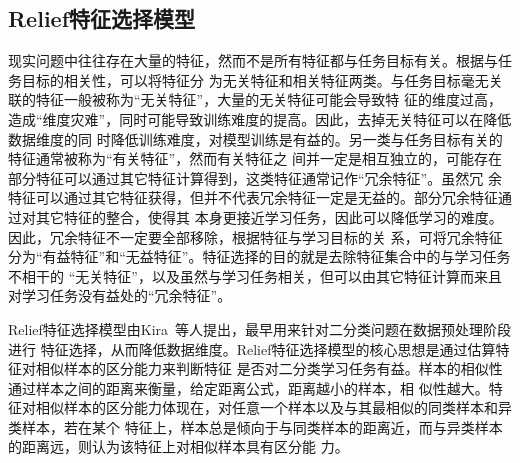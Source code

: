 \subsection{Relief特征选择模型}

现实问题中往往存在大量的特征，然而不是所有特征都与任务目标有关。根据与任务目标的相关性，可以将特征分
为无关特征和相关特征两类。与任务目标毫无关联的特征一般被称为``无关特征''，大量的无关特征可能会导致特
征的维度过高，造成``维度灾难''，同时可能导致训练难度的提高。因此，去掉无关特征可以在降低数据维度的同
时降低训练难度，对模型训练是有益的。另一类与任务目标有关的特征通常被称为``有关特征''，然而有关特征之
间并一定是相互独立的，可能存在部分特征可以通过其它特征计算得到，这类特征通常记作``冗余特征''。虽然冗
余特征可以通过其它特征获得，但并不代表冗余特征一定是无益的。部分冗余特征通过对其它特征的整合，使得其
本身更接近学习任务，因此可以降低学习的难度。因此，冗余特征不一定要全部移除，根据特征与学习目标的关
系，可将冗余特征分为``有益特征''和``无益特征''。特征选择的目的就是去除特征集合中的与学习任务不相干的
``无关特征''，以及虽然与学习任务相关，但可以由其它特征计算而来且对学习任务没有益处的``冗余特征''。

Relief特征选择模型由Kira~\cite{kira1992feature}等人提出，最早用来针对二分类问题在数据预处理阶段进行
特征选择，从而降低数据维度。Relief特征选择模型的核心思想是通过估算特征对相似样本的区分能力来判断特征
是否对二分类学习任务有益。样本的相似性通过样本之间的距离来衡量，给定距离公式，距离越小的样本，相
似性越大。特征对相似样本的区分能力体现在，对任意一个样本以及与其最相似的同类样本和异类样本，若在某个
特征上，样本总是倾向于与同类样本的距离近，而与异类样本的距离远，则认为该特征上对相似样本具有区分能
力。

